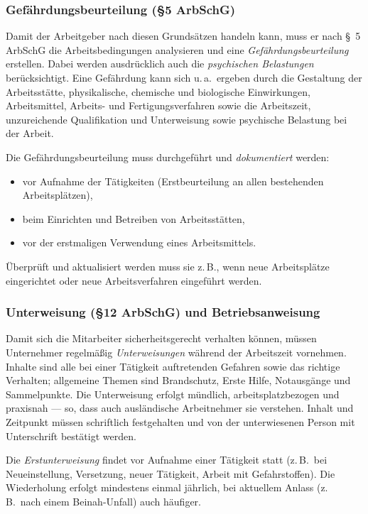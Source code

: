 \documentclass[11pt, a4paper]{article}
\begin{document}
\subsubsection{Gefährdungsbeurteilung (\S 5 ArbSchG)}

Damit der Arbeitgeber nach diesen Grundsätzen handeln kann, muss er nach \S~5 ArbSchG die
Arbeitsbedingungen analysieren und eine \emph{Gefährdungsbeurteilung} erstellen. Dabei
werden ausdrücklich auch die \emph{psychischen Belastungen} berücksichtigt. Eine
Gefährdung kann sich u.\,a.\ ergeben durch die Gestaltung der Arbeitsstätte, physikalische,
chemische und biologische Einwirkungen, Arbeitsmittel, Arbeits- und Fertigungsverfahren
sowie die Arbeitszeit, unzureichende Qualifikation und Unterweisung sowie psychische
Belastung bei der Arbeit.

Die Gefährdungsbeurteilung muss durchgeführt und \emph{dokumentiert} werden:

\begin{itemize}
  \item vor Aufnahme der Tätigkeiten (Erstbeurteilung an allen bestehenden Arbeitsplätzen),
  \item beim Einrichten und Betreiben von Arbeitsstätten,
  \item vor der erstmaligen Verwendung eines Arbeitsmittels.
\end{itemize}

Überprüft und aktualisiert werden muss sie z.\,B., wenn neue Arbeitsplätze eingerichtet
oder neue Arbeitsverfahren eingeführt werden.

\subsubsection{Unterweisung (\S 12 ArbSchG) und Betriebsanweisung}

Damit sich die Mitarbeiter sicherheitsgerecht verhalten können, müssen Unternehmer
regelmäßig \emph{Unterweisungen} während der Arbeitszeit vornehmen. Inhalte sind alle bei
einer Tätigkeit auftretenden Gefahren sowie das richtige Verhalten; allgemeine Themen sind
Brandschutz, Erste Hilfe, Notausgänge und Sammelpunkte. Die Unterweisung erfolgt mündlich,
arbeitsplatzbezogen und praxisnah --- so, dass auch ausländische Arbeitnehmer sie verstehen.
Inhalt und Zeitpunkt müssen schriftlich festgehalten und von der unterwiesenen Person mit
Unterschrift bestätigt werden.

Die \emph{Erstunterweisung} findet vor Aufnahme einer Tätigkeit statt (z.\,B.\ bei
Neueinstellung, Versetzung, neuer Tätigkeit, Arbeit mit Gefahrstoffen). Die Wiederholung
erfolgt mindestens einmal jährlich, bei aktuellem Anlass (z.\,B.\ nach einem Beinah-Unfall)
auch häufiger.
\end{document}
